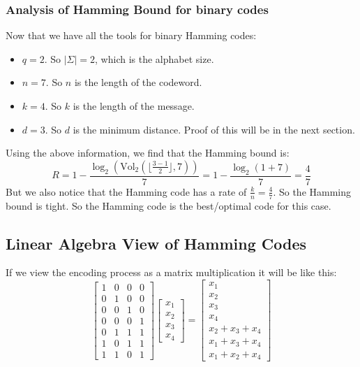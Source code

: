 \documentclass[letterpaper,12pt]{article}
\begin{document}
\subsubsection{Analysis of Hamming Bound for binary codes}
Now that we have all the tools for binary Hamming codes:\begin{itemize}
    \item $q=2$. So $|\Sigma|=2$, which is the alphabet size.
    \item $n=7$. So $n$ is the length of the codeword.
    \item $k=4$. So $k$ is the length of the message.
    \item $d=3$. So $d$ is the minimum distance. Proof of this will be in the next section.
\end{itemize}
Using the above information, we find that the Hamming bound is:\[
    R = 1-\frac{\log_2(\text{Vol}_2(\lfloor \frac{3-1}{2}\rfloor, 7))}{7}= 1-\frac{\log_2(1+7)}{7}=\frac{4}{7}
\]
But we also notice that the Hamming code has a rate of
$\frac{k}{n}=\frac{4}{7}$. So the Hamming bound is tight. So the Hamming code
is the best/optimal code for this case.

\subsection{Linear Algebra View of Hamming Codes}
If we view the encoding process as a matrix multiplication it will be like
this:
\[
    \begin{bmatrix}
        1 & 0 & 0 & 0 \\
        0 & 1 & 0 & 0 \\
        0 & 0 & 1 & 0 \\
        0 & 0 & 0 & 1 \\
        0 & 1 & 1 & 1 \\
        1 & 0 & 1 & 1 \\
        1 & 1 & 0 & 1
    \end{bmatrix}
    \begin{bmatrix}
        x_1 \\
        x_2 \\
        x_3 \\
        x_4
    \end{bmatrix}
    =
    \begin{bmatrix}
        x_1         \\
        x_2         \\
        x_3         \\
        x_4         \\
        x_2+x_3+x_4 \\
        x_1+x_3+x_4 \\
        x_1+x_2+x_4
    \end{bmatrix}
\]
\end{document}
